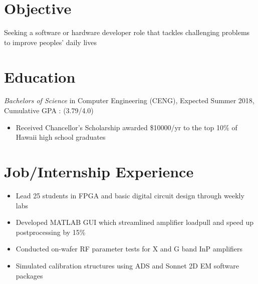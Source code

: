 \documentclass{resume}
\begin{document}
\raggedbottom
{}


\section{Objective}
Seeking a software or hardware developer role that tackles challenging problems to improve peoples' daily lives

\section{%
Education}
\textit{Bachelors of Science} in Computer Engineering (CENG), Expected Summer 2018, Cumulative GPA : (3.79/4.0)  
\begin{itemize}[noitemsep,nolistsep]
  \item Received Chancellor's Scholarship awarded \$10000/yr to the top 10\% of Hawaii high school graduates
\end{itemize}
\section{%
 Job/Internship Experience}

\begin{itemize}[noitemsep,nolistsep]
  \item Lead 25 students in FPGA and basic digital circuit design through weekly labs
\end{itemize} 

\begin{itemize}[noitemsep,nolistsep]
  \item Developed MATLAB GUI which streamlined amplifier loadpull and speed up postprocessing by 15\%
  \item Conducted on-wafer RF parameter tests for X and G band InP amplifiers
  \item Simulated calibration structures using ADS and Sonnet 2D EM software packages
\end{itemize}
\end{document}
